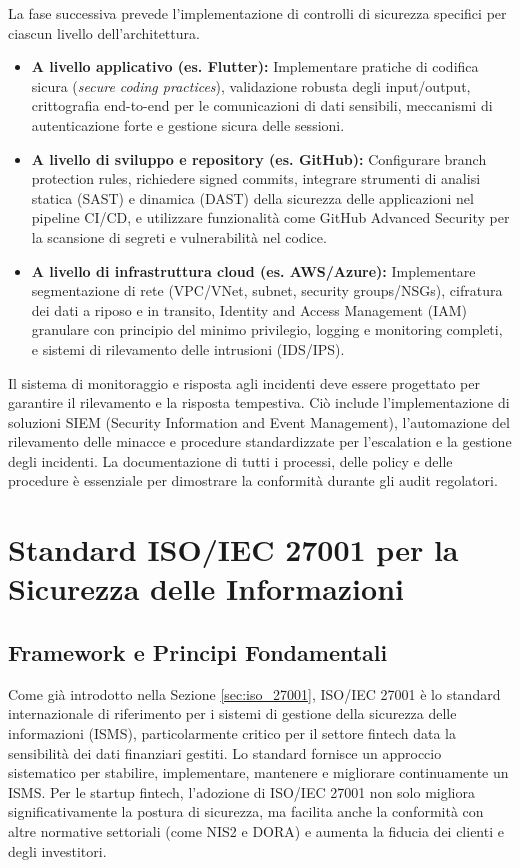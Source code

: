 La fase successiva prevede l'implementazione di controlli di sicurezza specifici per ciascun livello dell'architettura.
\begin{itemize}
    \item \textbf{A livello applicativo (es. Flutter):} Implementare pratiche di codifica sicura (\textit{secure coding practices}), validazione robusta degli input/output, crittografia end-to-end per le comunicazioni di dati sensibili, meccanismi di autenticazione forte e gestione sicura delle sessioni.
    \item \textbf{A livello di sviluppo e repository (es. GitHub):} Configurare branch protection rules, richiedere signed commits, integrare strumenti di analisi statica (SAST) e dinamica (DAST) della sicurezza delle applicazioni nel pipeline CI/CD, e utilizzare funzionalità come GitHub Advanced Security per la scansione di segreti e vulnerabilità nel codice.
    \item \textbf{A livello di infrastruttura cloud (es. AWS/Azure):} Implementare segmentazione di rete (VPC/VNet, subnet, security groups/NSGs), cifratura dei dati a riposo e in transito, Identity and Access Management (IAM) granulare con principio del minimo privilegio, logging e monitoring completi, e sistemi di rilevamento delle intrusioni (IDS/IPS).
\end{itemize}
Il sistema di monitoraggio e risposta agli incidenti deve essere progettato per garantire il rilevamento e la risposta tempestiva. Ciò include l'implementazione di soluzioni SIEM (Security Information and Event Management), l'automazione del rilevamento delle minacce e procedure standardizzate per l'escalation e la gestione degli incidenti. La documentazione di tutti i processi, delle policy e delle procedure è essenziale per dimostrare la conformità durante gli audit regolatori.

\section{Standard ISO/IEC 27001 per la Sicurezza delle Informazioni}
\label{sec:iso27001_compliance}

\subsection{Framework e Principi Fondamentali}
Come già introdotto nella Sezione \ref{sec:iso_27001}, ISO/IEC 27001 è lo standard internazionale di riferimento per i sistemi di gestione della sicurezza delle informazioni (ISMS), particolarmente critico per il settore fintech data la sensibilità dei dati finanziari gestiti. Lo standard fornisce un approccio sistematico per stabilire, implementare, mantenere e migliorare continuamente un ISMS. Per le startup fintech, l'adozione di ISO/IEC 27001 non solo migliora significativamente la postura di sicurezza, ma facilita anche la conformità con altre normative settoriali (come NIS2 e DORA) e aumenta la fiducia dei clienti e degli investitori.

